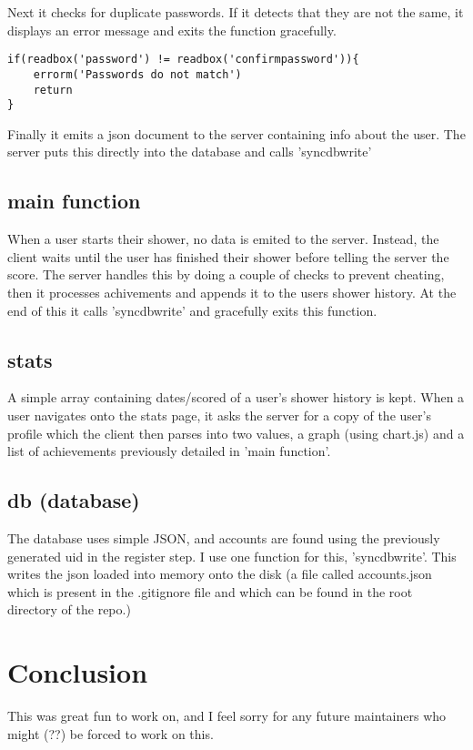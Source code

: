 \documentclass{article}
\begin{document}
Next it checks for duplicate passwords. If it detects that they are not the same, it displays an error message and exits the function gracefully.

\begin{minipage}{\linewidth}
\begin{lstlisting}
if(readbox('password') != readbox('confirmpassword')){
    errorm('Passwords do not match')
    return
}
\end{lstlisting}
\end{minipage}

Finally it emits a json document to the server containing info about the user. The server puts this directly into the database and calls 'syncdbwrite'

\subsection{main function}
When a user starts their shower, no data is emited to the server. Instead, the client waits until the user has finished their shower before telling the server the score.
The server handles this by doing a couple of checks to prevent cheating, then it processes achivements and appends it to the users shower history. At the end of this it calls 'syncdbwrite' and gracefully exits this function.

\subsection{stats}

A simple array containing dates/scored of a user's shower history is kept. When a user navigates onto the stats page, it asks the server for a copy of the user's profile which the client then parses into two values, a graph (using chart.js) and a list of achievements previously detailed in 'main function'.

\subsection{db (database)}

The database uses simple JSON, and accounts are found using the previously generated uid in the register step. I use one function for this, 'syncdbwrite'. This writes the json loaded into memory onto the disk (a file called accounts.json which is present in the .gitignore file and which can be found in the root directory of the repo.)

\section{Conclusion}

This was great fun to work on, and I feel sorry for any future maintainers who might (??) be forced to work on this.
\end{document}
